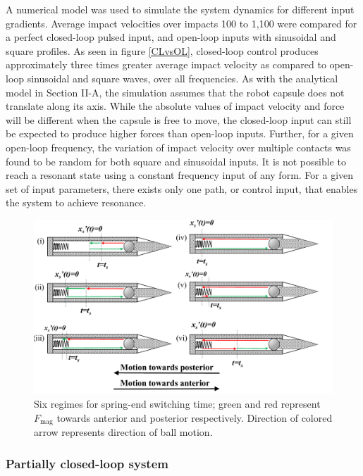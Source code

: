 \documentclass[letterpaper, 10 pt, conference]{ieeeconf}  %
\begin{document}
A numerical model was used to simulate the system dynamics for different input gradients. Average impact velocities over impacts 100 to 1,100 were compared for a perfect closed-loop pulsed input, and open-loop inputs with sinusoidal and square profiles. As seen in figure \ref{CLvsOL}, closed-loop control produces approximately three times greater average impact velocity as compared to open-loop sinusoidal and square waves, over all frequencies. As with the analytical model in Section II-A, the simulation assumes that the robot capsule does not translate along its axis. While the absolute values of impact velocity and force will be different when the capsule is free to move, the closed-loop input can still be expected to produce higher forces than open-loop inputs. Further, for a given open-loop frequency, the variation of impact velocity over multiple contacts was found to be random for both square and sinusoidal inputs. It is not possible to reach a resonant state using a constant frequency input of any form. For a given set of input parameters, there exists only one path, or control input, that enables the system to achieve resonance. 
\begin{figure}
	\includegraphics[width=\linewidth]{Tswitchcases.pdf}
	\caption{Six regimes for spring-end switching time; green and red represent $F_{\textrm{mag}}$ towards anterior and posterior respectively. Direction of colored arrow represents direction of ball motion.}
	\label{Tswitch}
	\vspace{-2em}
\end{figure}


\subsubsection{Partially closed-loop system}
\label{pcl}
\end{document}
